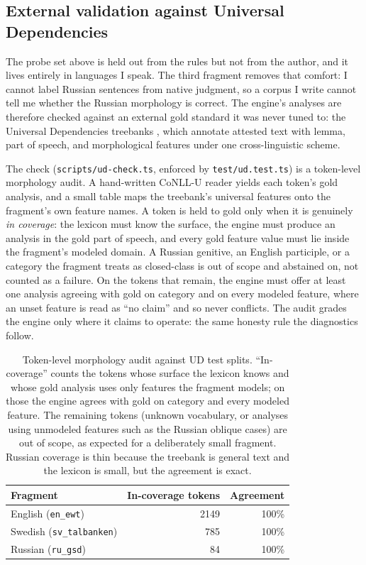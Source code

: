\documentclass[11pt]{article}
\theoremstyle{definition}
\theoremstyle{plain}
\theoremstyle{remark}
\begin{document}
\subsection{External validation against Universal Dependencies}
\label{sec:ud}

The probe set above is held out from the rules but not from the author, and it lives
entirely in languages I speak. The third fragment removes that comfort: I cannot label
Russian sentences from native judgment, so a corpus I write cannot tell me whether the
Russian morphology is correct. The engine's analyses are therefore checked against an
external gold standard it was never tuned to: the Universal Dependencies treebanks
\cite{nivre2020ud}, which annotate attested text with lemma, part of speech, and
morphological features under one cross-linguistic scheme.

The check (\texttt{scripts/ud-check.ts}, enforced by \texttt{test/ud.test.ts}) is a
token-level morphology audit. A hand-written CoNLL-U reader yields each token's gold
analysis, and a small table maps the treebank's universal features onto the fragment's own
feature names. A token is held to gold only when it is genuinely \emph{in coverage}: the
lexicon must know the surface, the engine must produce an analysis in the gold part of
speech, and every gold feature value must lie inside the fragment's modeled domain. A
Russian genitive, an English participle, or a category the fragment treats as closed-class
is out of scope and abstained on, not counted as a failure. On the tokens that remain, the
engine must offer at least one analysis agreeing with gold on category and on every modeled
feature, where an unset feature is read as ``no claim'' and so never conflicts. The audit
grades the engine only where it claims to operate: the same honesty rule the diagnostics
follow.

\begin{table}[H]
\centering
\begin{tabular}{@{}lrr@{}}
\toprule
Fragment & In-coverage tokens & Agreement \\
\midrule
English (\texttt{en\_ewt})       & 2149 & 100\% \\
Swedish (\texttt{sv\_talbanken}) &  785 & 100\% \\
Russian (\texttt{ru\_gsd})       &   84 & 100\% \\
\bottomrule
\end{tabular}
\caption{Token-level morphology audit against UD test splits. ``In-coverage'' counts the
tokens whose surface the lexicon knows and whose gold analysis uses only features the
fragment models; on those the engine agrees with gold on category and every modeled
feature. The remaining tokens (unknown vocabulary, or analyses using unmodeled features
such as the Russian oblique cases) are out of scope, as expected for a deliberately small
fragment. Russian coverage is thin because the treebank is general text and the lexicon is
small, but the agreement is exact.}
\end{table}
\end{document}
